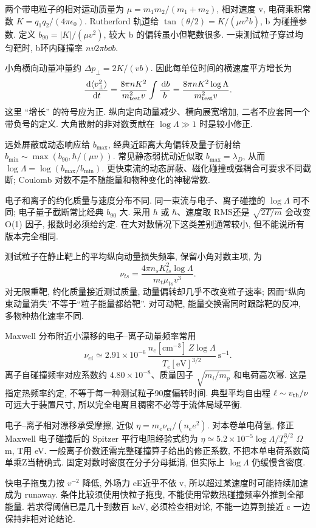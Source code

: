 \label{ch:collisions}
两个带电粒子的相对运动质量为 $\mu=m_1m_2/(m_1+m_2)$, 相对速度 v, 电荷乘积常数 $K=q_1q_2/(4\pi\epsilon_0)$. Rutherford 轨道给 $\tan(\theta/2)=K/(\mu v^2b)$, b 为碰撞参数. 定义 $b_{90}=|K|/(\mu v^2)$, 较大 b 的偏转虽小但靶数很多. 一束测试粒子穿过均匀靶时, b环内碰撞率 $n v 2\pi b\dd b$.

小角横向动量冲量约 $\Delta p_\perp=2K/(vb)$. 因此每单位时间的横速度平方增长为
\begin{equation}
 \frac{\,\mathrm d\langle v_\perp^2\rangle}{\,\mathrm d t}=\frac{8\pi nK^2}{m_{
\rm test}^2v}\int\frac{\,\mathrm d b}b
 =\frac{8\pi nK^2\log\Lambda}{m_{
\rm test}^2v}.
\end{equation}
这里 ``增长'' 的符号应为正. 纵向定向动量减少、横向展宽增加, 二者不应套同一个带负号的定义. 大角散射的非对数贡献在 $\log\Lambda\gg1$ 时是较小修正.

远处屏蔽或动态响应给 $b_{\max}$, 经典近距离大角偏转及量子衍射给 $b_{\min}\sim\max(b_{90},\hbar/(\mu v))$. 常见静态弱扰动近似取 $b_{\max}=\lambda_D$, 从而 $\log\Lambda=\log(b_{\max}/b_{\min})$. 更快束流的动态屏蔽、磁化碰撞或强耦合可要求不同截断; Coulomb 对数不是不随能量和物种变化的神秘常数.

电子和离子的约化质量与速度分布不同. 同一束流与电子、离子碰撞的 $\log\Lambda$ 可不同; 电子量子截断常比经典 $b_{90}$ 大. 采用 $h$ 或 $\hbar$、速度取 RMS还是 $\sqrt{2T/m}$ 会改变 O(1) 因子, 报数时必须给约定. 在大对数情况下这类差别通常较小, 但不能说所有版本完全相同.

测试粒子在静止靶上的平均纵向动量损失频率, 保留小角对数主项, 为
\begin{equation}\label{eq:fast-slow}
 \nu_{ts}=\frac{4\pi n_sK_{ts}^2\log\Lambda}{m_t\mu_{ts}v^3}.
\end{equation}
对无限重靶, 约化质量接近测试质量, 动量偏转却几乎不改变粒子速率; 因而``纵向束动量消失''不等于``粒子能量都给靶''. 对可动靶, 能量交换需同时跟踪靶的反冲, 多物种热化速率不同.

Maxwell 分布附近小漂移的电子--离子动量频率常用
\begin{equation}
 \nu_{ei}\simeq2.91\times10^{-6}\,
 \frac{n_e[\mathrm{cm}^{-3}]\,Z\log\Lambda}{T_e[\mathrm{eV}]^{3/2}}\ \mathrm{s}^{-1}.
\end{equation}
离子自碰撞频率对应系数约 $4.80\times10^{-8}$、质量因子 $\sqrt{m_i/m_p}$ 和电荷高次幂. 这是指定热频率约定, 不等于每一种测试粒子90度偏转时间. 典型平均自由程 $\ell\sim v_{\rm th}/\nu$ 可远大于装置尺寸, 所以完全电离且稠密不必等于流体局域平衡.

电子--离子相对漂移承受摩擦, 近似 $\eta=m_e\nu_{ei}/(n_ee^2)$. 对本卷单电荷氢, 修正 Maxwell 电子碰撞后的 Spitzer 平行电阻经验式约为 $\eta\simeq5.2\times10^{-5}\log\Lambda/T_e^{3/2}$ $\Omega\,$m, T用 eV. 一般离子价数还需完整碰撞算子给出的修正系数, 不把本单电荷系数简单乘Z当精确式. 固定对数时密度在分子分母抵消, 但实际上 $\log\Lambda$ 仍缓慢含密度.

快电子拖曳力按 $v^{-2}$ 降低, 外场力 eE近乎不依 v, 所以超过某速度时可能持续加速成为 runaway. 条件比较须使用快粒子拖曳, 不能使用常数热碰撞频率外推到全部能量. 若求得阈值已是几十到数百 keV, 必须检查相对论, 不能一边算到接近 c 一边保持非相对论结论.
